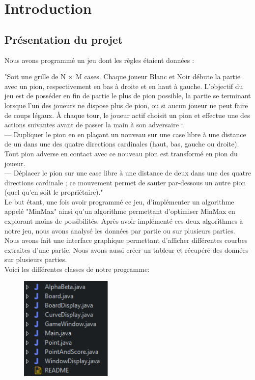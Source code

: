 \chapter{Introduction}

\section{Présentation du projet}
\flushleft Nous avons programmé un jeu dont les règles étaient données : 

"Soit une grille de N × M cases. Chaque joueur Blanc et Noir débute la partie avec un
pion, respectivement en bas à droite et en haut à gauche. L'objectif du jeu est de posséder en
fin de partie le plus de pion possible, la partie se terminant lorsque l'un des joueurs ne dispose
plus de pion, ou si aucun joueur ne peut faire de coups légaux. À chaque tour, le joueur actif
choisit un pion et effectue une des actions suivantes avant de passer la main à son adversaire :\\
— Dupliquer le pion en en plaçant un nouveau sur une case libre à une distance de un dans
une des quatre directions cardinales (haut, bas, gauche ou droite). Tout pion adverse 
en contact avec ce nouveau pion est transformé en pion du joueur. \\
— Déplacer le pion sur une case libre à une distance de deux dans une des quatre directions
cardinale ; ce mouvement permet de sauter par-dessous un autre pion (quel qu'en soit
le propriétaire)."
\\[0.5 cm]
Le but étant, une fois avoir programmé ce jeu, d'implémenter un algorithme appelé "MinMax" ainsi
qu'un algorithme permettant d'optimiser MinMax en explorant moins de possibilités. Après avoir implémenté
ces deux algorithmes à notre jeu, nous avons analysé les données par partie ou sur plusieurs parties.
Nous avons fait une interface graphique permettant d'afficher différentes courbes extraites d'une partie.
Nous avons aussi créer un tableur et récupéré des données sur plusieurs parties. \\


Voici les différentes classes de notre programme: \\
\begin{figure}[!ht]
\begin{center}
\includegraphics[width=0.40\textwidth]{./ARBORESCENCE}~\\
\end{center}
\end{figure}
\newpage


